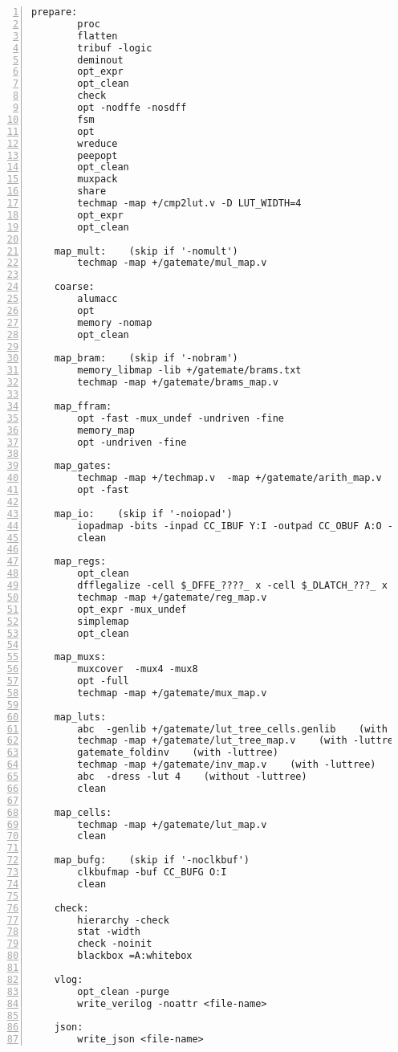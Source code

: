 \begin{lstlisting}[numbers=left,frame=single]
    prepare:
        proc
        flatten
        tribuf -logic
        deminout
        opt_expr
        opt_clean
        check
        opt -nodffe -nosdff
        fsm
        opt
        wreduce
        peepopt
        opt_clean
        muxpack
        share
        techmap -map +/cmp2lut.v -D LUT_WIDTH=4
        opt_expr
        opt_clean

    map_mult:    (skip if '-nomult')
        techmap -map +/gatemate/mul_map.v

    coarse:
        alumacc
        opt
        memory -nomap
        opt_clean

    map_bram:    (skip if '-nobram')
        memory_libmap -lib +/gatemate/brams.txt
        techmap -map +/gatemate/brams_map.v

    map_ffram:
        opt -fast -mux_undef -undriven -fine
        memory_map
        opt -undriven -fine

    map_gates:
        techmap -map +/techmap.v  -map +/gatemate/arith_map.v
        opt -fast

    map_io:    (skip if '-noiopad')
        iopadmap -bits -inpad CC_IBUF Y:I -outpad CC_OBUF A:O -toutpad CC_TOBUF ~T:A:O -tinoutpad CC_IOBUF ~T:Y:A:IO
        clean

    map_regs:
        opt_clean
        dfflegalize -cell $_DFFE_????_ x -cell $_DLATCH_???_ x
        techmap -map +/gatemate/reg_map.v
        opt_expr -mux_undef
        simplemap
        opt_clean

    map_muxs:
        muxcover  -mux4 -mux8
        opt -full
        techmap -map +/gatemate/mux_map.v

    map_luts:
        abc  -genlib +/gatemate/lut_tree_cells.genlib    (with -luttree)
        techmap -map +/gatemate/lut_tree_map.v    (with -luttree)
        gatemate_foldinv    (with -luttree)
        techmap -map +/gatemate/inv_map.v    (with -luttree)
        abc  -dress -lut 4    (without -luttree)
        clean

    map_cells:
        techmap -map +/gatemate/lut_map.v
        clean

    map_bufg:    (skip if '-noclkbuf')
        clkbufmap -buf CC_BUFG O:I
        clean

    check:
        hierarchy -check
        stat -width
        check -noinit
        blackbox =A:whitebox

    vlog:
        opt_clean -purge
        write_verilog -noattr <file-name>

    json:
        write_json <file-name>
\end{lstlisting}

